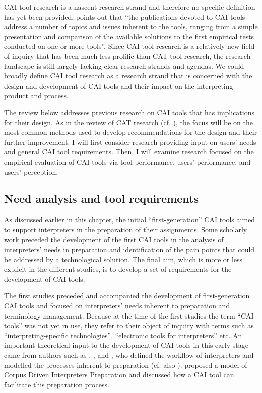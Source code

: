 CAI tool research is a nascent research strand and therefore no specific definition has yet been provided. \citet[85]{prandi2022a} points out that ``the publications devoted to CAI tools address a number of topics and issues inherent to the tools, ranging from a simple presentation and comparison of the available solutions to the first empirical tests conducted on one or more tools''. Since CAI tool research is a relatively new field of inquiry that has been much less prolific than CAT tool research, the research landscape is still largely lacking clear research strands and agendas. We could broadly define CAI tool research as a research strand that is concerned with the design and development of CAI tools and their impact on the interpreting product and process.

The review below addresses previous research on CAI tools that has implications for their design. As in the review of CAT research (cf. ), the focus will be on the most common methods used to develop recommendations for the design and their further improvement. I will first consider research providing input on users’ needs and general CAI tool requirements. Then, I will examine research focused on the empirical evaluation of CAI tools via tool performance, users’ performance, and users’ perception.



\subsection{Need analysis and tool requirements}


As discussed earlier in this chapter, the initial “first-generation” CAI tools aimed to support interpreters in the preparation of their assignments. Some scholarly work preceded the development of the first CAI tools in the analysis of interpreters’ needs in preparation and identification of the pain points that could be addressed by a technological solution. The final aim, which is more or less explicit in the different studies, is to develop a set of requirements for the development of CAI tools.

The first studies preceded and accompanied the development of first-gen\-er\-a\-tion CAI tools and focused on interpreters’ needs inherent to preparation and terminology management. Because at the time of the first studies the term ``CAI tools'' was not yet in use, they refer to their object of inquiry with terms such as ``interpreting-specific technologies'', ``electronic tools for interpreters'' etc. An important theoretical input to the development of CAI tools in this early stage came from authors such as \citet{gile1987terminotique}, \citet{kalina2000interpreting,Kalina2007}, and \citet{will2009dolmetschorientierte}, who defined the workflow of interpreters and modelled the processes inherent to preparation (cf. also \cite{kalina2015}). \citet{fantinuoli2006specialized} proposed a model of Corpus Driven Interpreters Preparation and discussed how a CAI tool can facilitate this preparation process.

